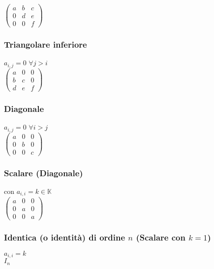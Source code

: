 \documentclass[a4paper, twoside, italian, 11pt]{book}
\newcommand{\K}{\mathbb{K}}
\begin{document}
\noindent
$\begin{pmatrix}
a & b & c \\
0 & d & e \\
0 & 0 & f
\end{pmatrix}$


\subsubsection{Triangolare inferiore}

$a_{i,j} = 0$ $\forall j > i$ \\

\noindent
$\begin{pmatrix}
a & 0 & 0 \\
b & c & 0 \\
d & e & f
\end{pmatrix}$


\subsubsection{Diagonale}

$a_{i,j} = 0$ $\forall i > j$ \\

\noindent
$\begin{pmatrix}
a & 0 & 0 \\
0 & b & 0 \\
0 & 0 & c
\end{pmatrix}$


\subsubsection{Scalare (Diagonale)}

con $a_{i,i} = k \in \K$ \\

\noindent
$\begin{pmatrix}
a & 0 & 0 \\
0 & a & 0 \\
0 & 0 & a
\end{pmatrix}$


\subsubsection{Identica (o identità) di ordine $n$ (Scalare con $k = 1$)}

$a_{i,i} = k$ \\

\noindent
$I_n$ \\
\end{document}
